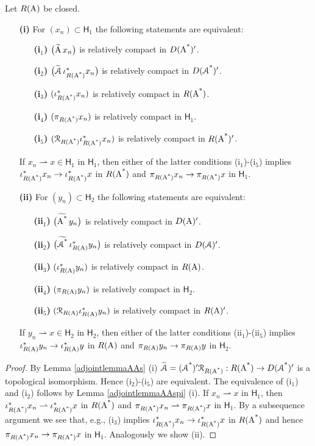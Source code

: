 \documentclass[a4paper]{amsart}
\newcommand{\wto}{\rightharpoonup}
\renewcommand{\H}{\mathsf{H}}
\renewcommand{\R}{\mathcal{R}}
\begin{document}
\begin{lem}
Let $R(\operatorname{A})$ be closed. 
\begin{itemize}
\item[\bf(i)]
For $(x_{n})\subset\H_{1}$ the following statements are equivalent:
\begin{itemize}
\item[\bf(i$_{1}$)]
$\big(\widetilde{\operatorname{A}}\,x_{n}\big)$ is relatively compact in $D(\operatorname{\operatorname{A}^{*}})'$.
\item[\bf(i$_{2}$)]
$\big(\widetilde{\operatorname{\mathcal{A}}}\,\iota_{R(\operatorname{\operatorname{A}^{*}})}^{*}x_{n}\big)$ is relatively compact in $D(\operatorname{\operatorname{\mathcal{A}}^{*}})'$.
\item[\bf(i$_{3}$)]
$(\iota_{R(\operatorname{\operatorname{A}^{*}})}^{*}x_{n})$ is relatively compact in $R(\operatorname{\operatorname{A}^{*}})$.
\item[\bf(i$_{4}$)]
$(\pi_{R(\operatorname{\operatorname{A}^{*}})}x_{n})$ is relatively compact in $\H_{1}$.
\item[\bf(i$_{5}$)]
$(\R_{R(\As)}\iota_{R(\As)}^{*}x_{n})$ is relatively compact in $R(\operatorname{\operatorname{A}^{*}})'$.
\end{itemize}
If $x_{n}\wto x\in\H_{1}$ in $\H_{1}$,
then either of the latter conditions (i$_{1}$)-(i$_{5}$)
implies $\iota_{R(\operatorname{\operatorname{A}^{*}})}^{*}x_{n}\to\iota_{R(\operatorname{\operatorname{A}^{*}})}^{*}x$ in $R(\operatorname{\operatorname{A}^{*}})$ 
and $\pi_{R(\operatorname{\operatorname{A}^{*}})}x_{n}\to\pi_{R(\operatorname{\operatorname{A}^{*}})}x$ in $\H_{1}$.
\item[\bf(ii)]
For $(y_{n})\subset\H_{2}$ the following statements are equivalent:
\begin{itemize}
\item[\bf(ii$_{1}$)]
$\big(\widetilde{\operatorname{\operatorname{A}^{*}}}\,y_{n}\big)$ is relatively compact in $D(\operatorname{A})'$.
\item[\bf(ii$_{2}$)]
$\big(\widetilde{\operatorname{\operatorname{\mathcal{A}}^{*}}}\,\iota_{R(\operatorname{A})}^{*}y_{n}\big)$ is relatively compact in $D(\operatorname{\mathcal{A}})'$.
\item[\bf(ii$_{3}$)]
$(\iota_{R(\operatorname{A})}^{*}y_{n})$ is relatively compact in $R(\operatorname{A})$.
\item[\bf(ii$_{4}$)]
$(\pi_{R(\operatorname{A})}y_{n})$ is relatively compact in $\H_{2}$.
\item[\bf(ii$_{5}$)]
$(\R_{R(\A)}\iota_{R(\A)}^{*}y_{n})$ is relatively compact in $R(\operatorname{A})'$.
\end{itemize}
If $y_{n}\wto x\in\H_{2}$ in $\H_{2}$,
then either of the latter conditions (ii$_{1}$)-(ii$_{5}$)
implies $\iota_{R(\operatorname{A})}^{*}y_{n}\to\iota_{R(\operatorname{A})}^{*}y$ in $R(\operatorname{A})$ 
and $\pi_{R(\operatorname{A})}y_{n}\to\pi_{R(\operatorname{A})}y$ in $\H_{2}$.
\end{itemize}
\end{lem}

\begin{proof}
By Lemma \ref{adjointlemmaAAs} (i)
$\widetilde{\cA}=(\cAs)'\R_{R(\As)}:R(\As)\to D(\cAs)'$ 
is a topological isomorphism.
Hence (i$_{2}$)-(i$_{5}$) are equivalent.
The equivalence of (i$_{1}$) and (i$_{2}$) follows by Lemma \ref{adjointlemmaAAspi} (i).
If $x_{n}\wto x$ in $\H_{1}$,
then $\iota_{R(\As)}^{*}x_{n}\wto\iota_{R(\As)}^{*}x$ in $R(\operatorname{\operatorname{A}^{*}})$ 
and $\pi_{R(\As)}x_{n}\wto\pi_{R(\As)}x$ in $\H_{1}$.
By a subsequence argument we see that, e.g., (i$_{3}$)
implies $\iota_{R(\operatorname{\operatorname{A}^{*}})}^{*}x_{n}\to\iota_{R(\operatorname{\operatorname{A}^{*}})}^{*}x$ in $R(\operatorname{\operatorname{A}^{*}})$ 
and hence $\pi_{R(\operatorname{\operatorname{A}^{*}})}x_{n}\to\pi_{R(\operatorname{\operatorname{A}^{*}})}x$ in $\H_{1}$.
Analogously we show (ii).
\end{proof}
\end{document}
